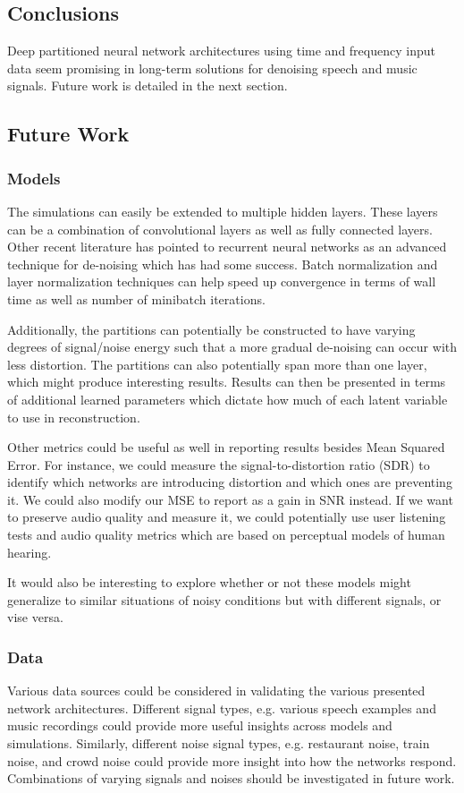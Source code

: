 \subsection{Conclusions}
Deep partitioned neural network architectures using time and frequency input data seem promising in long-term solutions for denoising speech and music signals. Future work is detailed in the next section.

\subsection{Future Work}
\subsubsection{Models}
The simulations can easily be extended to multiple hidden layers. These layers can be a combination of convolutional layers as well as fully connected layers. \cite{kayserdenoising} Other recent literature has pointed to recurrent neural networks as an advanced technique for de-noising which has had some success. \cite{graves2014towards} Batch normalization and layer normalization techniques can help speed up convergence in terms of wall time as well as number of minibatch iterations. \cite{2016arXiv160706450L}

Additionally, the partitions can potentially be constructed to have varying degrees of signal/noise energy such that a more gradual de-noising can occur with less distortion. The partitions can also potentially span more than one layer, which might produce interesting results. Results can then be presented in terms of additional learned parameters which dictate how much of each latent variable to use in reconstruction.

Other metrics could be useful as well in reporting results besides Mean Squared Error. For instance, we could measure the signal-to-distortion ratio (SDR) to identify which networks are introducing distortion and which ones are preventing it. We could also modify our MSE to report as a gain in SNR instead. If we want to preserve audio quality and measure it, we could potentially use user listening tests and audio quality metrics which are based on perceptual models of human hearing.

It would also be interesting to explore whether or not these models might generalize to similar situations of noisy conditions but with different signals, or vise versa.

\subsubsection{Data}
Various data sources could be considered in validating the various presented network architectures. Different signal types, e.g. various speech examples and music recordings could provide more useful insights across models and simulations. Similarly, different noise signal types, e.g. restaurant noise, train noise, and crowd noise could provide more insight into how the networks respond. Combinations of varying signals and noises should be investigated in future work.